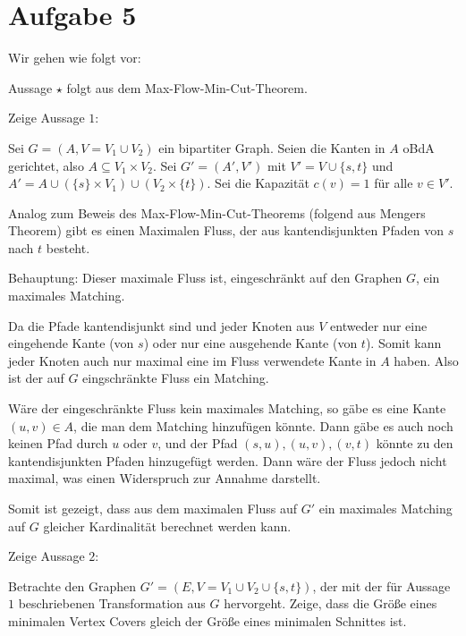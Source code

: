 \documentclass[a4paper]{article}
\begin{document}
\section{Aufgabe 5}

Wir gehen wie folgt vor:


Aussage $\star$ folgt aus dem Max-Flow-Min-Cut-Theorem.

Zeige Aussage $1$:

Sei $G = (A, V = V_1 \cup V_2)$ ein bipartiter Graph.
Seien die Kanten in $A$ oBdA gerichtet, also $A \subseteq V_1 \times V_2$.
Sei $G' = (A', V')$ mit $V' = V \cup
\{s, t\}$ und $A' = A \cup (\{s\} \times V_1) \cup (V_2 \times \{t\})$.
Sei die Kapazität $c(v) = 1$ für alle $v \in V'$.

Analog zum Beweis des Max-Flow-Min-Cut-Theorems (folgend aus Mengers
Theorem) gibt es einen Maximalen Fluss, der aus kantendisjunkten Pfaden von
$s$ nach $t$ besteht.

Behauptung: Dieser maximale Fluss ist, eingeschränkt auf den Graphen $G$, ein maximales Matching.

Da die Pfade kantendisjunkt sind und jeder Knoten aus $V$ entweder nur eine
eingehende Kante (von $s$) oder nur eine ausgehende Kante (von $t$). Somit
kann jeder Knoten auch nur maximal eine im Fluss verwendete Kante in $A$
haben. Also ist der auf $G$ eingschränkte Fluss ein Matching.

Wäre der eingeschränkte Fluss kein maximales Matching, so gäbe es eine Kante
$(u, v) \in A$, die man dem Matching hinzufügen könnte. Dann gäbe es auch
noch keinen Pfad durch $u$ oder $v$, und der Pfad $(s,u), (u,v), (v, t)$
könnte zu den kantendisjunkten Pfaden hinzugefügt werden. Dann wäre der
Fluss jedoch nicht maximal, was einen Widerspruch zur Annahme darstellt.

Somit ist gezeigt, dass aus dem maximalen Fluss auf $G'$ ein maximales
Matching auf $G$ gleicher Kardinalität berechnet werden kann.

Zeige Aussage $2$:

Betrachte den Graphen $G' = (E, V = V_1 \cup V_2 \cup \{s, t\})$, der mit
der für Aussage $1$ beschriebenen Transformation aus $G$ hervorgeht.
Zeige, dass die Größe eines minimalen Vertex Covers gleich der Größe eines
minimalen Schnittes ist.
\end{document}
